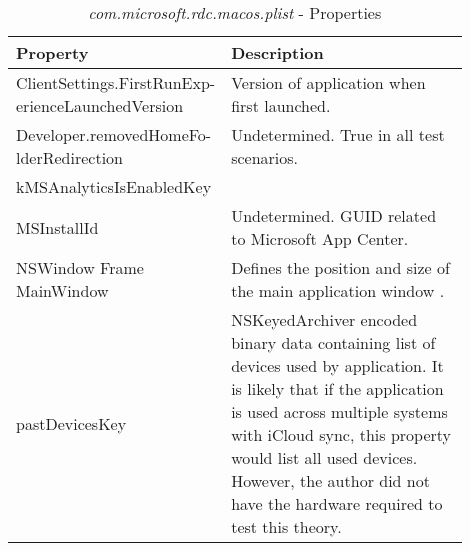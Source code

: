 \documentclass[journal]{IEEEtran}
\begin{document}
\begin{table}[h!]
\caption{\textit{com.microsoft.rdc.macos.plist} - Properties}
\begin{tabular}{p{0.35\linewidth} | p{0.55\linewidth}}
Property                                           & Description                                                                                                                                                                                                                                                                                       \\ \hline
ClientSettings.FirstRunExp- erienceLaunchedVersion & Version of application when first launched.                                                                                                                                                                                                                                                       \\
Developer.removedHomeFo- lderRedirection           & Undetermined. True in all test scenarios.                                                                                                                                                                                                                                                         \\
kMSAnalyticsIsEnabledKey                           &                                                                                                                                                                                                                                                                                                   \\
MSInstallId                                        & Undetermined. GUID related to Microsoft App Center.                                                                                                                                                                                                                                               \\
NSWindow Frame MainWindow                          & Defines the position and size of the main application window \cite{noauthor_frame_nodate}.                                                                                                                                                                                     \\
pastDevicesKey                                     & NSKeyedArchiver encoded binary data containing list of devices used by application. It is likely that if the application is used across multiple systems with iCloud sync, this property would list all used devices. However, the author did not have the hardware required to test this theory. \\

\end{tabular}
\end{table}
\end{document}
